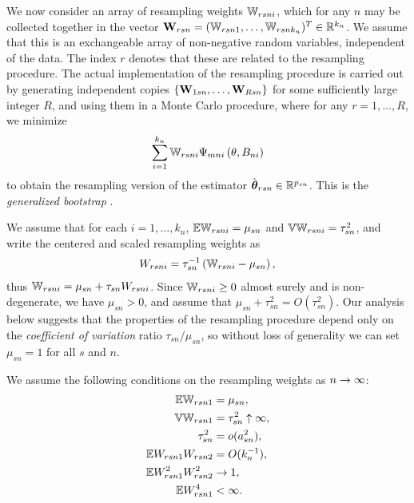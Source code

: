 \vspace{1em}
We now consider an array of resampling weights ${\mathbb{W}}_{r s n i}$, which for any $n$ may be collected together in the vector ${\mathbf{W}}_{r s n} = ( {\mathbb{W}}_{r s n 1}, \ldots,  {\mathbb{W}}_{r s n k_{n}})^{T} \in {\mathbb{R}}^{k_{n}}$. We assume that this is an exchangeable array of  non-negative random variables,  independent of the data. The index $r$ denotes that these are related to the resampling procedure. The actual implementation of the resampling procedure is carried out by generating independent copies $ \{ {\mathbf{W}}_{1 s n}, \ldots, {\mathbf{W}}_{R s n} \}$ for some sufficiently large integer $R$, and using them in a Monte Carlo procedure, where for any $r = 1, \ldots, R$, we minimize
%
\begin{equation}\label{eq:ResamplingMinimization}
\sum_{i =1}^{k_{n}} {\mathbb{W}}_{r s n i} \Psi_{m n i}  \left( \theta, B_{ni} \right)
\end{equation}
%
to obtain the resampling version of the estimator $\hat{{\boldsymbol{\theta}}}_{r s n} \in {\mathbb{R}}^{p_{s n}}$. This is the \textit{generalized bootstrap} \citep{ChatterjeeBose05}.

We assume that for each $i = 1, \ldots, k_{n}$, ${\mathbb{E}} {\mathbb{W}}_{r s n i} = \mu_{s n}$ and ${\mathbb{V}} {\mathbb{W}}_{r s n i} = \tau_{s n}^{2}$, and write the centered and scaled resampling weights as
\begin{align} 
 W_{r s n i} = \tau_{s n}^{-1} \left( {\mathbb{W}}_{r s n i}  - \mu_{s n} \right), 
 \end{align} 
 thus 
 ${\mathbb{W}}_{r s n i}  = \mu_{s n} +  \tau_{s n} W_{r s n i}$. 
Since ${\mathbb{W}}_{r s n i} \geq 0$ almost surely and is non-degenerate, we have $\mu_{s n} > 0$, and assume that 
$\mu_{s n} + \tau_{s n}^{2} = O (\tau_{s n}^{2})$. Our analysis below suggests that the properties of the resampling procedure depend only on the \textit{coefficient of variation} ratio $\tau_{s n}/ \mu_{s n}$, so without loss of generality we can set $\mu_{s n} = 1$ for all $s$ and $n$. 

We assume the following conditions on the resampling weights as $n \rightarrow \infty$:
\begin{eqnarray}
{\mathbb{E}} {\mathbb{W}}_{r s n 1}  & = \mu_{s n}, 
\label{eq:ResamplingWeightMean}\\
{\mathbb{V}} {\mathbb{W}}_{r s n 1}  & = \tau_{s n}^{2} \uparrow \infty, 
\label{eq:ResamplingWeightVariance}\\
\tau_{s n}^{2} 
& = o ( a_{s n}^{2}), 
\label{eq:TauSqCondition}\\
{\mathbb{E}} W_{r s n 1} W_{r s n 2} & = O (k_{n}^{-1}), 
\label{eq:c11} \\
{\mathbb{E}} W_{r s n 1}^{2} W_{r s n 2}^{2} & \rightarrow 1, 
\label{eq:c22} \\
{\mathbb{E}} W_{r s n 1}^{4} & < \infty. 
\label{eq:c22}
\end{eqnarray}
 

